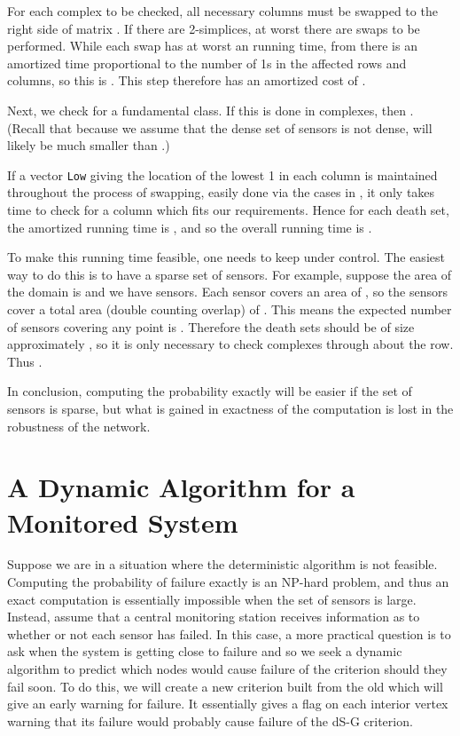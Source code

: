 \documentclass[10pt,twocolumn]{article} \usepackage{amsmath,epsf,amssymb,cite,pifont,amsthm, mathrsfs,epsfig,  bbm, amsthm,  setspace}
\renewcommand{\1}{\mathbbm{1}}
\begin{document}
For each complex to be checked,  all necessary columns must be swapped to the right side of matrix .
If there are  2-simplices, at worst there are  swaps to be performed.
While each swap has at worst an  running time, from \cite{Cohen-Steiner2006}
there is an amortized time proportional to the number of 1s in the affected rows and columns, so this is .
This step therefore has an amortized cost of .

Next, we check for a fundamental class.
If this is done in  complexes,  then .
(Recall that because we assume that the dense set of sensors is not dense,  will likely be much smaller than .)

If  a vector \texttt{Low} giving the location of the lowest 1 in each column is maintained throughout the process of swapping,  easily done via the cases in \cite{Cohen-Steiner2006}, it only takes  time to check for a column which fits our requirements.
Hence for each death set, the amortized running time is , and so the overall running time is .

To make this running time feasible, one needs to keep  under control.
The easiest way to do this is to have a sparse set of sensors.
For example, suppose the area of the domain  is  and we have  sensors.
Each sensor covers an area of , so the sensors cover a total area (double counting overlap) of .
This means the expected number of sensors covering any point is .
Therefore the death sets should be of size approximately , so it is only necessary
to check complexes through about the  row.
Thus .

In conclusion, computing the probability exactly will be easier if the set of sensors is sparse,
but what is gained in exactness of the computation is lost  in the robustness of the network.





\section{A Dynamic Algorithm for a Monitored System}\label{S: Monitored System}


Suppose we are in a situation where the deterministic algorithm is not feasible.
Computing the probability of failure exactly is an NP-hard problem,
and thus an exact computation is essentially impossible when the set of sensors is large.
Instead, assume that a central monitoring station receives information as to whether or not each sensor has failed.
In this case, a more practical question is to ask when  the system is getting close to failure and so we seek a dynamic algorithm to predict which nodes would cause failure of the criterion should they fail soon.
To do this, we will create a new criterion built from the old which will give an early warning for failure.
It essentially gives a flag on each interior vertex warning that its failure would probably cause failure of the dS-G criterion.
\end{document}
